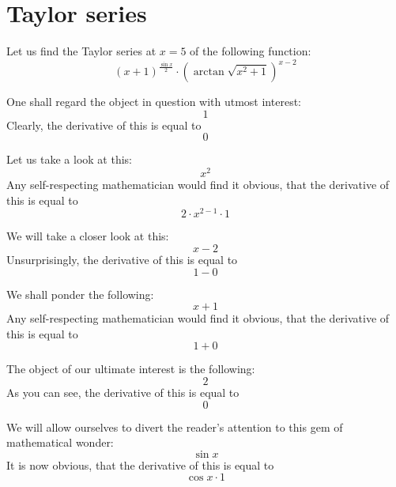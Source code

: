 \documentclass{article}
\begin{document}
\newpage
\section{Taylor series}
Let us find the Taylor series at $x = 5$ of the following function:
\begin{equation}
\left( x + 1 \right) ^{\frac{\sin x }{2 } } \cdot \left( \arctan \sqrt {x ^{2 } + 1 } \right) ^{x - 2 } 
\end{equation}

One shall regard the object in question with utmost interest:
\begin{equation}
1 
\end{equation}
Clearly, the derivative of this is equal to
\begin{equation}
0 
\end{equation}

Let us take a look at this:
\begin{equation}
x ^{2 } 
\end{equation}
Any self-respecting mathematician would find it obvious, that the derivative of this is equal to
\begin{equation}
2 \cdot x ^{2 - 1 } \cdot 1 
\end{equation}

We will take a closer look at this:
\begin{equation}
x - 2 
\end{equation}
Unsurprisingly, the derivative of this is equal to
\begin{equation}
1 - 0 
\end{equation}

We shall ponder the following:
\begin{equation}
x + 1 
\end{equation}
Any self-respecting mathematician would find it obvious, that the derivative of this is equal to
\begin{equation}
1 + 0 
\end{equation}

The object of our ultimate interest is the following:
\begin{equation}
2 
\end{equation}
As you can see, the derivative of this is equal to
\begin{equation}
0 
\end{equation}

We will allow ourselves to divert the reader's attention to this gem of mathematical wonder:
\begin{equation}
\sin x 
\end{equation}
It is now obvious, that the derivative of this is equal to
\begin{equation}
\cos x \cdot 1 
\end{equation}
\end{document}
